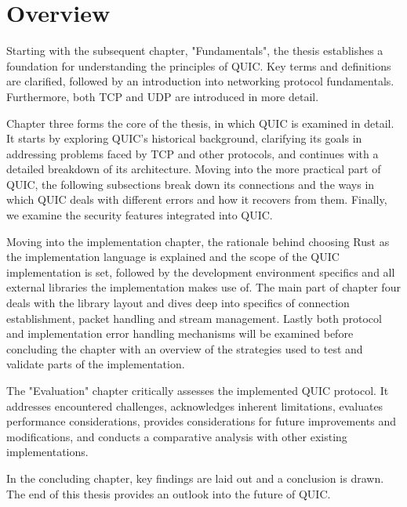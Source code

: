 \section{Overview}

Starting with the subsequent chapter, "Fundamentals", the thesis establishes a foundation for understanding
the principles of QUIC. Key terms and definitions are clarified, followed by an introduction into networking
protocol fundamentals. Furthermore, both TCP and UDP are introduced in more detail.

Chapter three forms the core of the thesis, in which QUIC is examined in detail. It starts by exploring QUIC's
historical background, clarifying its goals in addressing problems faced by TCP and other protocols, and continues
with a detailed breakdown of its architecture. Moving into the more practical part of QUIC, the following
subsections break down its connections and the ways in which QUIC deals with different errors and how it recovers
from them. Finally, we examine the security features integrated into QUIC.

Moving into the implementation chapter, the rationale behind choosing Rust as the implementation
language is explained and the scope of the QUIC implementation is set, followed by the development environment specifics
and all external libraries the implementation makes use of. The main part of chapter four deals with the library layout
and dives deep into specifics of connection establishment, packet handling and stream management. Lastly both protocol
and implementation error handling mechanisms will be examined before concluding the chapter with an overview
of the strategies used to test and validate parts of the implementation.

The "Evaluation" chapter critically assesses the implemented QUIC protocol. It addresses encountered challenges,
acknowledges inherent limitations, evaluates performance considerations, provides considerations for future
improvements and modifications, and conducts a comparative analysis with other existing implementations.

In the concluding chapter, key findings are laid out and a conclusion is drawn. The end of this thesis provides
an outlook into the future of QUIC.